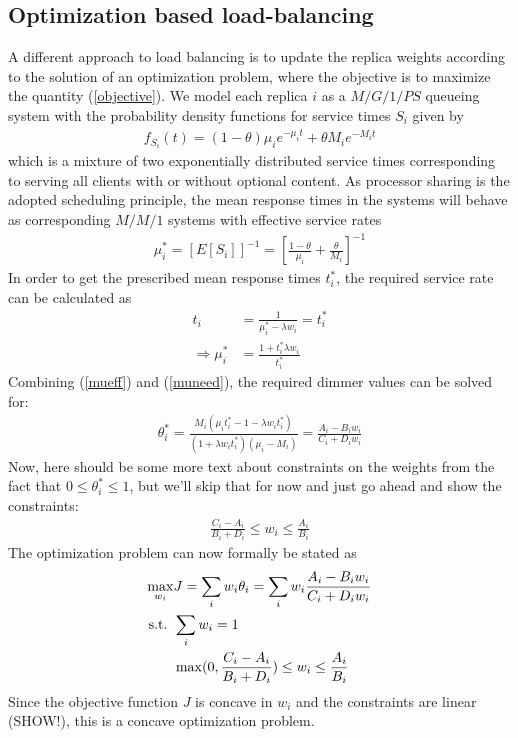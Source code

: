 \subsection{Optimization based load-balancing}
A different approach to load balancing is to update the replica weights according to the solution of an optimization problem, where the objective is to maximize the quantity (\ref{objective}). We model each replica $i$ as a $M/G/1/PS$ queueing system with the probability density functions for service times $S_i$ given by
\begin{align}
f_{S_i} (t) = (1-\theta) \mu_i e^{-\mu_i t} + \theta M_i e^{-M_i t}
\end{align}
which is a mixture of two exponentially distributed service times corresponding to serving all clients with or without optional content. As processor sharing is the adopted scheduling principle, the mean response times in the systems will behave as corresponding $M/M/1$ systems with effective service rates
\begin{align}
\mu_i^* = \left[ E[S_i] \right]^{-1} = \left[ \frac{1-\theta}{\mu_i} + \frac{\theta}{M_i} \right]^{-1} \label{mueff}
\end{align}
In order to get the prescribed mean response times $t_i^*$, the required service rate can be calculated as
\begin{align}
t_i & = \frac{1}{\mu_i^*-\lambda w_i} = t_i^* \\
\Longrightarrow \mu_i^* & = \frac{1+t_i^*\lambda w_i}{t_i^*} \label{muneed}
\end{align}
Combining (\ref{mueff}) and (\ref{muneed}), the required dimmer values can be solved for:
\begin{align}
\theta_i^* = \frac{M_i \left( \mu_i t_i^* - 1 -\lambda w_i t_i^* \right)}{{\left( 1+\lambda w_i t_i^* \right) \left(\mu_i-M_i \right)}} = \frac{A_i - B_i w_i}{C_i + D_i w_i}
\end{align}
Now, here should be some more text about constraints on the weights from the fact that $0 \leq \theta_i^* \leq 1$, but we'll skip that for now and just go ahead and show the constraints:
\begin{align}
\frac{C_i-A_i}{B_i+D_i} \leq w_i \leq \frac{A_i}{B_i}
\end{align}
The optimization problem can now formally be stated as
\begin{align}
\max_{w_i} & J = \sum_i w_i \theta_i = \sum_i w_i  \frac{A_i - B_i w_i}{C_i + D_i w_i} \\
\textnormal{s.t. } & \sum_i w_i = 1 \\
& \max (0,\frac{C_i-A_i}{B_i+D_i}) \leq w_i \leq \frac{A_i}{B_i}
\end{align}
Since the objective function $J$ is concave in $w_i$ and the constraints are linear (SHOW!), this is a concave optimization problem.

